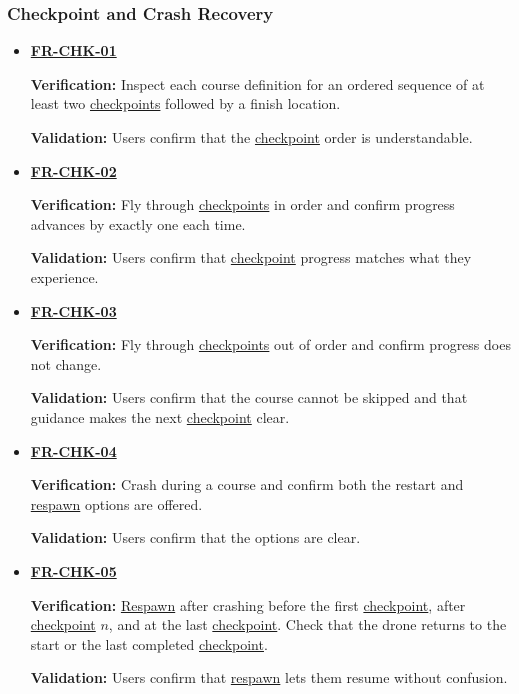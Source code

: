 \documentclass[12pt]{article}
\begin{document}
\subsubsection{Checkpoint and Crash Recovery}
\begin{itemize}
\item \hyperlink{req:FR-CHK-01}{\textbf{FR-CHK-01}}\par
 \textbf{Verification:} Inspect each course definition for an ordered
 sequence of at least two \hyperlink{glos:Checkpoint}{checkpoints} followed by a finish location.\par
 \textbf{Validation:} Users confirm that the \hyperlink{glos:Checkpoint}{checkpoint} order is understandable.
\item \hyperlink{req:FR-CHK-02}{\textbf{FR-CHK-02}}\par
 \textbf{Verification:} Fly through \hyperlink{glos:Checkpoint}{checkpoints} in order and confirm
 progress advances by exactly one each time.\par
 \textbf{Validation:} Users confirm that \hyperlink{glos:Checkpoint}{checkpoint} progress matches what they experience.
\item \hyperlink{req:FR-CHK-03}{\textbf{FR-CHK-03}}\par
 \textbf{Verification:} Fly through \hyperlink{glos:Checkpoint}{checkpoints} out of order and confirm
 progress does not change.\par
 \textbf{Validation:} Users confirm that the course cannot be skipped and that
 guidance makes the next \hyperlink{glos:Checkpoint}{checkpoint} clear.
\item \hyperlink{req:FR-CHK-04}{\textbf{FR-CHK-04}}\par
 \textbf{Verification:} Crash during a course and confirm both the restart
 and \hyperlink{glos:Respawn}{respawn} options are offered.\par
 \textbf{Validation:} Users confirm that the options are clear.
\item \hyperlink{req:FR-CHK-05}{\textbf{FR-CHK-05}}\par
 \textbf{Verification:} \hyperlink{glos:Respawn}{Respawn} after crashing before the first \hyperlink{glos:Checkpoint}{checkpoint},
 after \hyperlink{glos:Checkpoint}{checkpoint} $n$, and at the last \hyperlink{glos:Checkpoint}{checkpoint}. Check that the drone
 returns to the start or the last completed \hyperlink{glos:Checkpoint}{checkpoint}.\par
 \textbf{Validation:} Users confirm that \hyperlink{glos:Respawn}{respawn} lets them resume without confusion.

\end{itemize}
\end{document}
